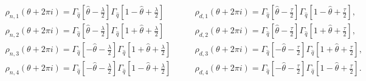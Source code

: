 \begin{equation*}
\begin{array}{ll}
\rho _{n,1}(\theta +2\pi i)=\Gamma _{\hat{q}}[\hat{\theta}-\frac{\lambda }{2}%
]\Gamma _{\hat{q}}[1-\hat{\theta}+\frac{\lambda }{2}]\quad & \rho
_{d,1}(\theta +2\pi i)=\Gamma _{\hat{q}}[\hat{\theta}-\frac{\tau }{2}]\Gamma
_{\hat{q}}[1-\hat{\theta}+\frac{\tau }{2}], \\ 
\rho _{n,2}(\theta +2\pi i)=\Gamma _{\hat{q}}[\hat{\theta}-\frac{\lambda }{2}%
]\Gamma _{\hat{q}}[1+\hat{\theta}+\frac{\lambda }{2}]\quad & \rho
_{d,2}(\theta +2\pi i)=\Gamma _{\hat{q}}[\hat{\theta}-\frac{\tau }{2}]\Gamma
_{\hat{q}}[1+\hat{\theta}+\frac{\tau }{2}], \\ 
\rho _{n,3}(\theta +2\pi i)=\Gamma _{\hat{q}}[-\hat{\theta}-\frac{\lambda }{2%
}]\Gamma _{\hat{q}}[1+\hat{\theta}+\frac{\lambda }{2}]\quad \quad & \rho
_{d,3}(\theta +2\pi i)=\Gamma _{\hat{q}}[-\hat{\theta}-\frac{\tau }{2}%
]\Gamma _{\hat{q}}[1+\hat{\theta}+\frac{\tau }{2}], \\ 
\rho _{n,4}(\theta +2\pi i)=\Gamma _{\hat{q}}[-\hat{\theta}-\frac{\lambda }{2%
}]\Gamma _{\hat{q}}[1-\hat{\theta}+\frac{\lambda }{2}] & \rho _{d,4}(\theta
+2\pi i)=\Gamma _{\hat{q}}[-\hat{\theta}-\frac{\tau }{2}]\Gamma _{\hat{q}}[1-%
\hat{\theta}+\frac{\tau }{2}].%
\end{array}%
\end{equation*}%
